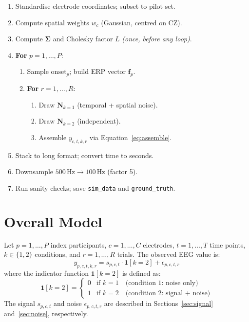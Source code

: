 \documentclass[12pt, a4paper]{article}
\begin{document}
\begin{enumerate}[leftmargin=2em, label=\textbf{\arabic*.}]
  \item Standardise electrode coordinates; subset to pilot set.
  \item Compute spatial weights $w_c$ (Gaussian, centred on CZ).
  \item Compute $\boldsymbol{\Sigma}$ and Cholesky factor $L$
        \emph{(once, before any loop)}.
  \item \textbf{For} $p = 1, \ldots, P$:
  \begin{enumerate}[label=\alph*.]
    \item Sample $\mathrm{onset}_p$; build ERP vector $\mathbf{f}_p$.
    \item \textbf{For} $r = 1, \ldots, R$:
    \begin{enumerate}[label=\roman*.]
      \item Draw $\mathbf{N}_{k=1}$ (temporal + spatial noise).
      \item Draw $\mathbf{N}_{k=2}$ (independent).
      \item Assemble $y_{c,t,k,r}$ via Equation~\eqref{eq:assemble}.
    \end{enumerate}
  \end{enumerate}
  \item Stack to long format; convert time to seconds.
  \item Downsample $500\,\text{Hz} \to 100\,\text{Hz}$ (factor 5).
  \item Run sanity checks; save \texttt{sim\_data} and
        \texttt{ground\_truth}.
\end{enumerate}

\section{Overall Model}\label{sec:overall}

Let $p = 1, \ldots, P$ index participants, $c = 1, \ldots, C$ electrodes,
$t = 1, \ldots, T$ time points, $k \in \{1, 2\}$ conditions, and
$r = 1, \ldots, R$ trials.
The observed EEG value is:
%
\begin{equation}\label{eq:observation}
  y_{p,c,t,k,r}
    = s_{p,c,t} \cdot \mathbf{1}[k = 2]
    + \epsilon_{p,c,t,r}
\end{equation}
%
where the indicator function $\mathbf{1}[k=2]$ is defined as:
\begin{equation}\label{eq:indicator}
  \mathbf{1}[k=2] =
  \begin{cases}
    0 & \text{if } k = 1 \quad \text{(condition 1: noise only)}\\
    1 & \text{if } k = 2 \quad \text{(condition 2: signal + noise)}
  \end{cases}
\end{equation}
The signal $s_{p,c,t}$ and noise $\epsilon_{p,c,t,r}$ are described in
Sections~\ref{sec:signal} and~\ref{sec:noise}, respectively.
\end{document}
